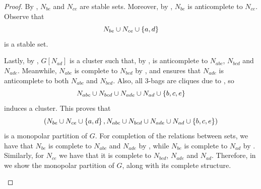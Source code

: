 \begin{proof}
    By , $N_{be}$ and $N_{ce}$ are stable sets. Moreover, by
    , $N_{be}$ is anticomplete to $N_{ce}$. Observe that
    \[
        N_{be} \cup N_{ce} \cup \left\{a,d\right\}
    \]
    is a stable set.

    Lastly, by , $G[N_{ad}]$ is a cluster such that, by
    , is anticomplete to $N_{abc}$,
    $N_{bcd}$ and $N_{ade}$. Meanwhile, $N_{abc}$ is complete to $N_{bcd}$ by
    , and  ensures that $N_{ade}$ is
    anticomplete to both $N_{abc}$ and $N_{bcd}$. Also, all 3-bags are cliques
    due to , so 
    \[
        N_{abc} \cup N_{bcd} \cup N_{ade} \cup N_{ad} \cup \left\{b,c,e\right\}
    \]
    induces a cluster. This proves that
    \[
        \left(N_{be} \cup N_{ce} \cup \left\{a,d\right\} , N_{abc} \cup N_{bcd} \cup N_{ade} 
        \cup N_{ad} \cup \left\{b,c,e\right\}\right)
    \]
    is a monopolar partition of $G$. For completion of the relations between
    sets, we have that $N_{be}$ is complete to $N_{abc}$ and $N_{ade}$ by
    , while $N_{be}$ is complete to $N_{ad}$ by
    . Similarly, for $N_{ce}$ we have that it is complete to
    $N_{bcd}$, $N_{ade}$ and $N_{ad}$. Therefore, in
     we show the monopolar partition of $G$,
    along with its complete structure.

    \begin{figure}[htb!]
        \centering
\end{figure}
\end{proof}
